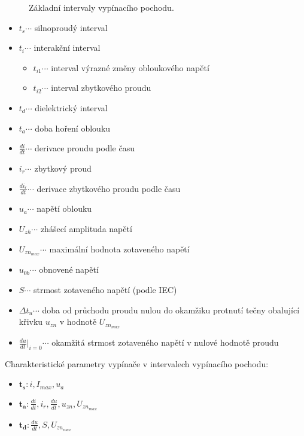       \begin{figure*}
        \centering
        \caption[Základní intervaly vypínacího pochodu.]{Základní intervaly vypínacího pochodu.}
        \label{epr:fig_zakl_int_vyp_pochodu}
      \end{figure*}

      \begin{itemize}
        \item $t_s\cdots$     silnoproudý interval
      \item $t_i\cdots$     interakční interval
          \begin{itemize}
            \item $t_{i1}\cdots$  interval výrazné změny obloukového napětí
            \item $t_{i2}\cdots$  interval zbytkového proudu
          \end{itemize}
      \item $t_d\cdots$    dielektrický interval
      \item $t_a\cdots$    doba hoření oblouku
      \item $\frac{di}{dt}\cdots$ derivace proudu podle času
      \item $i_r\cdots$    zbytkový proud
      \item $\frac{di_r}{dt}\cdots$ derivace zbytkového proudu podle času
      \item $u_a\cdots$    napětí oblouku
      \item $U_{zh}\cdots$ zhášecí amplituda napětí
      \item $U_{zn_{max}}\cdots$ maximální hodnota zotaveného napětí
      \item $u_{0b}\cdots$ obnovené napětí
      \item $S\cdots$    strmost zotaveného napětí (podle IEC)
      \item $\Delta t_u\cdots$ doba od průchodu proudu nulou do okamžiku protnutí tečny obalující
            křivku $u_{zn}$ v hodnotě $U_{zn_{max}}$
      \item $\frac{du}{dt}|_{i=0}\cdots$ okamžitá strmost zotaveného napětí v nulové hodnotě
            proudu
      \end{itemize}
      Charakteristické parametry vypínače v intervalech vypínacího pochodu:
      \begin{itemize}
        \item $\mathbf{t_s}: i, I_{max}, u_a$
        \item $\mathbf{t_a}: \frac{di}{dt},i_r, \frac{du}{dt}, u_{zn}, U_{zn_{max}}$
        \item $\mathbf{t_d}: \frac{du}{dt}, S, U_{zn_{max}}$
      \end{itemize}

